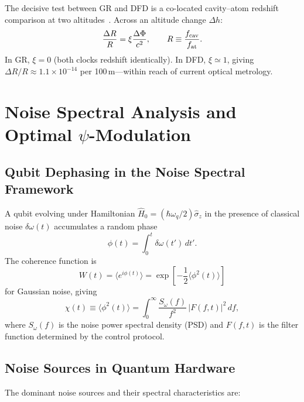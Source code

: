 \documentclass[aps,prd,twocolumn,superscriptaddress,nofootinbib]{revtex4-2}
\begin{document}
The decisive test between GR and DFD is a co-located cavity--atom
redshift comparison at two altitudes~\cite{Alcock2025Penrose}. Across an
altitude change $\Delta h$:
\begin{equation}
\frac{\Delta R}{R} = \xi\frac{\Delta\Phi}{c^2}, \qquad
R \equiv \frac{f_{\rm cav}}{f_{\rm at}}.
\end{equation}
In GR, $\xi = 0$ (both clocks redshift identically). In DFD, $\xi \simeq 1$,
giving $\Delta R/R \approx 1.1 \times 10^{-14}$ per 100\,m---within
reach of current optical metrology.

\section{Noise Spectral Analysis and Optimal $\psi$-Modulation}
\label{sec:noise}

\subsection{Qubit Dephasing in the Noise Spectral Framework}

A qubit evolving under Hamiltonian $\hat{H}_0 = (\hbar\omega_q/2)
\hat{\sigma}_z$ in the presence of classical noise $\delta\omega(t)$
accumulates a random phase
\begin{equation}
\phi(t) = \int_0^t \delta\omega(t')\,dt'.
\end{equation}
The coherence function is
\begin{equation}
W(t) = \langle e^{i\phi(t)}\rangle = \exp\!\left[-\frac{1}{2}
\langle\phi^2(t)\rangle\right]
\end{equation}
for Gaussian noise, giving
\begin{equation}\label{eq:chi-general}
\chi(t) \equiv \langle\phi^2(t)\rangle = \int_0^\infty
\frac{S_\omega(f)}{f^2}\,|F(f,t)|^2\,df,
\end{equation}
where $S_\omega(f)$ is the noise power spectral density (PSD) and
$F(f,t)$ is the filter function determined by the control protocol.

\subsection{Noise Sources in Quantum Hardware}

The dominant noise sources and their spectral characteristics are:
\end{document}
